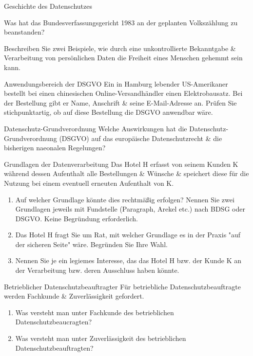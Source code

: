 \documentclass{exercisesheet}
\author{Leopold Lemmermann}
\begin{document}
\createtitle

\begin{exercise}{Geschichte des Datenschutzes}
  \item Was hat das Bundesverfassungsgericht 1983 an der geplanten Volkszählung zu beanstanden?
  \item Beschreiben Sie zwei Beispiele, wie durch eine unkontrollierte Bekanntgabe \& Verarbeitung von persönlichen Daten die Freiheit eines Menschen gehemmt sein kann.
\end{exercise}

\begin{exercise*}{Anwendungsbereich der DSGVO}
  Ein in Hamburg lebender US-Amerikaner bestellt bei einen chinesischen Online-Versandhändler einen Elektrobausatz. Bei der Bestellung gibt er Name, Anschrift \& seine E-Mail-Adresse an. Prüfen Sie stichpunktartig, ob auf diese Bestellung die DSGVO anwendbar wäre.
\end{exercise*}

\begin{exercise*}{Datenschutz-Grundverordnung}
  Welche Auswirkungen hat die Datenschutz-Grundverordnung (DSGVO) auf das europäische Datenschutzrecht \& die bisherigen naeonalen Regelungen?
\end{exercise*}

\begin{exercise*}{Grundlagen der Datenverarbeitung}
  Das Hotel H erfasst von seinem Kunden K während dessen Aufenthalt alle Bestellungen \& Wünsche \& speichert diese für die Nutzung bei einem eventuell erneuten Aufenthalt von K.
  \begin{enumerate}
    \item Auf welcher Grundlage könnte dies rechtmäßig erfolgen? Nennen Sie zwei Grundlagen jeweils mit Fundstelle (Paragraph, Arekel etc.) nach BDSG oder DSGVO. Keine Begründung erforderlich.
    \item Das Hotel H fragt Sie um Rat, mit welcher Grundlage es in der Praxis "auf der sicheren Seite" wäre. Begründen Sie Ihre Wahl.
    \item Nennen Sie je ein legiemes Interesse, das das Hotel H bzw. der Kunde K an der Verarbeitung bzw. deren Ausschluss haben könnte.
  \end{enumerate}
\end{exercise*}

\begin{exercise*}{Betrieblicher Datenschutzbeauftragter}
  Für betriebliche Datenschutzbeauftragte werden Fachkunde \& Zuverlässigkeit gefordert.
  \begin{enumerate}
    \item Was versteht man unter Fachkunde des betrieblichen Datenschutzbeaucragten?
    \item Was versteht man unter Zuverlässigkeit des betrieblichen Datenschutzbeauftragten?
  \end{enumerate}
\end{exercise*}
\end{document}
